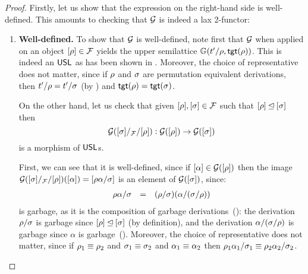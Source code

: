 \begin{proof}
Firstly, let us show that the expression on the right-hand side is well-defined.
This amounts to checking that $\mathcal{G}$ is indeed a lax 2-functor:
\begin{enumerate}
\item {\bf Well-defined.}
  To show that $\mathcal{G}$ is well-defined,
  note first that $\mathcal{G}$ when applied on an object ${[\rho]} \in \mathcal{F}$ yields the
  upper semilattice $\mathbb{G}(t'/\rho, \mathsf{tgt}(\rho))$.
  This is indeed an $\mathsf{USL}$ as has been shown in .
  Moreover, the choice of representative does not matter,
  since if $\rho$ and $\sigma$ are permutation equivalent derivations,
  then $t'/\rho = t'/\sigma$ (by )
  and $\mathsf{tgt}(\rho) = \mathsf{tgt}(\sigma)$.

  On the other hand, let us check that given ${[\rho]},{[\sigma]} \in \mathcal{F}$
  such that ${[\rho]} \unlhd {[\sigma]}$
  then
  \[
    \mathcal{G}({[\sigma]}/_{\mathcal{F}}/{[\rho]}) : \mathcal{G}({[\rho]}) \to \mathcal{G}({[\sigma]})
  \]
  is a morphism of $\mathsf{USL}$s.

  First, we can see that it is well-defined,
  since if ${[\alpha]} \in \mathcal{G}([\rho])$
  then the image $\mathcal{G}({[\sigma]}/_{\mathcal{F}}/{[\rho]})({[\alpha]}) = {[\rho\alpha/\sigma]}$
  is an element of $\mathcal{G}([\sigma])$,
  since:
  \[
    \begin{array}{rcll}
      \rho\alpha/\sigma & = & (\rho/\sigma)(\alpha/(\sigma/\rho)) \\
    \end{array}
  \]
  is garbage, as it is the composition of garbage derivations~():
  the derivation $\rho/\sigma$ is garbage since ${[\rho]} \unlhd {[\sigma]}$ (by definition),
  and the derivation $\alpha/(\sigma/\rho)$ is garbage since $\alpha$ is garbage~().
  Moreover, the choice of representative does not matter,
  since if $\rho_1 \equiv \rho_2$ and $\sigma_1 \equiv \sigma_2$ and $\alpha_1 \equiv \alpha_2$
  then $\rho_1\alpha_1/\sigma_1 \equiv \rho_2\alpha_2/\sigma_2$.


\end{enumerate}
\end{proof}
